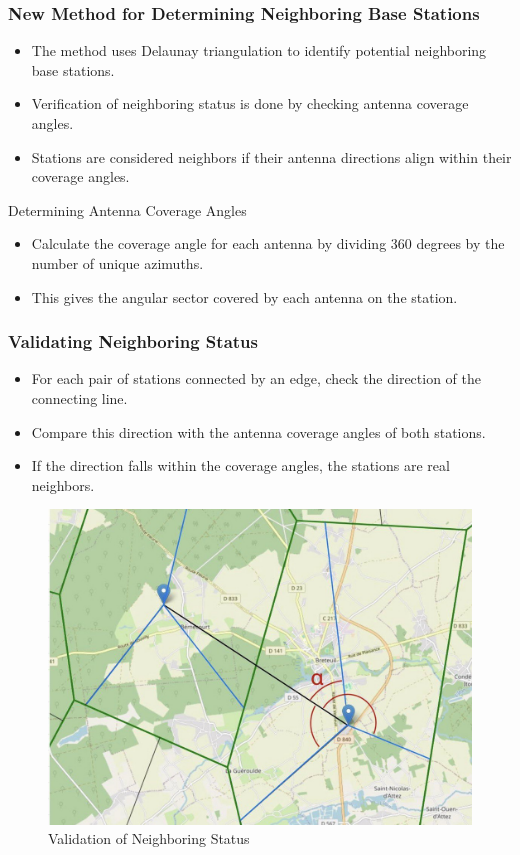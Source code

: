 \begin{frame}
    \frametitle{New Method for Determining Neighboring Base Stations}
    \begin{itemize}
        \item The method uses Delaunay triangulation to identify potential neighboring base stations.
        \item Verification of neighboring status is done by checking antenna coverage angles.
        \item Stations are considered neighbors if their antenna directions align within their coverage angles.
    \end{itemize}
    \begin{block}{Determining Antenna Coverage Angles}
        \begin{itemize}
            \item Calculate the coverage angle for each antenna by dividing 360 degrees by the number of unique azimuths.
            \item This gives the angular sector covered by each antenna on the station.
        \end{itemize}
    \end{block}
    \end{frame}


\begin{frame}
    \frametitle{Validating Neighboring Status}
    \begin{itemize}
        \item For each pair of stations connected by an edge, check the direction of the connecting line.
        \item Compare this direction with the antenna coverage angles of both stations.
        \item If the direction falls within the coverage angles, the stations are real neighbors.
    \end{itemize}
    \begin{figure}
        \includegraphics[height=0.5\paperheight]{images/Altair/antenn-angle.png} 
        \caption{Validation of Neighboring Status}
    \end{figure}
\end{frame}
    

